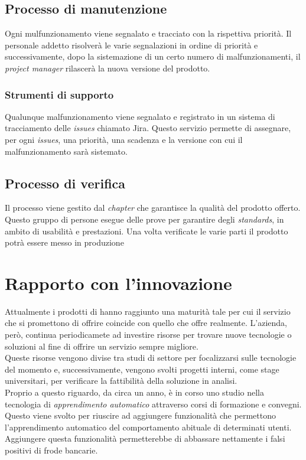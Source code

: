 \subsection{Processo di manutenzione}
Ogni mulfunzionamento viene segnalato e tracciato con la rispettiva priorità. Il personale addetto risolverà le varie segnalazioni in ordine di priorità e successivamente, dopo la sistemazione di un certo numero di malfunzionamenti, il \textit{project manager} rilascerà la nuova versione del prodotto.
\subsubsection{Strumenti di supporto}
Qualunque malfunzionamento viene segnalato e registrato in un sistema di tracciamento delle \textit{issues} chiamato Jira. Questo servizio permette di assegnare, per ogni \textit{issues}, una priorità, una scadenza e la versione con cui il malfunzionamento sarà sistemato. 
\subsection{Processo di verifica}
Il processo viene gestito dal \textit{chapter} che garantisce la qualità del prodotto offerto. Questo gruppo di persone esegue delle prove per garantire degli \textit{standards}, in ambito di usabilità e prestazioni. Una volta verificate le varie parti il prodotto potrà essere messo in produzione






\section{Rapporto con l'innovazione}
Attualmente i prodotti di \textit{\azienda} hanno raggiunto una maturità tale per cui il servizio che si promettono di offrire coincide con quello che offre realmente. L'azienda, però, continua periodicamete ad investire risorse per trovare nuove tecnologie o soluzioni al fine di offrire un servizio sempre migliore.\\
Queste risorse vengono divise tra studi di settore per focalizzarsi sulle tecnologie del momento e, successivamente, vengono svolti progetti interni, come stage universitari, per verificare la fattibilità della soluzione in analisi. \\
Proprio a questo riguardo, da circa un anno, è in corso uno studio nella tecnologia di \textit{apprendimento automatico} attraverso corsi di formazione e convegni. Questo viene svolto per riuscire ad aggiungere funzionalità che permettono l'apprendimento automatico del comportamento abituale di determinati utenti. Aggiungere questa funzionalità permetterebbe di abbassare nettamente i falsi positivi di frode bancarie.


